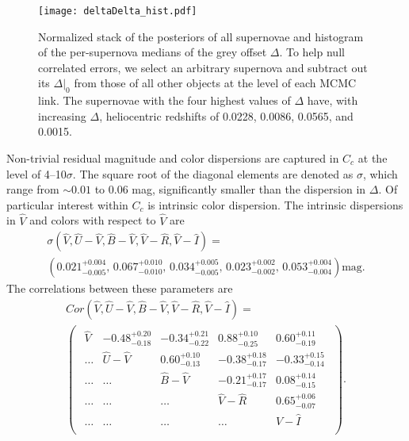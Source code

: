\documentclass{aastex61}   	%
\begin{document}
\begin{figure}[htbp] %
   \centering
   \texttt{[image: deltaDelta\_hist.pdf]} 
   \caption{
   Normalized \color{red} stack of the posteriors of all supernovae \color{black} and histogram of the \color{red} per-supernova \color{black} medians of the grey offset $\Delta$. 
   \color{red}  To help null correlated errors, we select
    an arbitrary supernova and subtract out its $\Delta|_0$ from those of all other objects at the level of each MCMC link.
   \color{black}
   The supernovae with the four highest values of $\Delta$ have, with increasing $\Delta$, heliocentric
   redshifts of 0.0228, 0.0086, 0.0565, and 0.0015.
   \label{hist:fig}}
\end{figure}

Non-trivial residual magnitude
and color dispersions are captured in $C_c$
at the level of 4--10$\sigma$.
The square
root of the diagonal elements are denoted as $\sigma$, which
range from
$\sim 0.01$ to 0.06 mag, significantly smaller
than the dispersion in $\Delta$.
Of particular interest within $C_c$ is intrinsic color dispersion.  The intrinsic dispersions in ${\hat{V}}$ and colors with respect to ${\hat{V}}$ are
\begin{multline}
\sigma({\hat{V}},{\hat{U}}-{\hat{V}},{\hat{B}}-{\hat{V}},{\hat{V}}-{\hat{R}},{\hat{V}}-{\hat{I}})=\\
\left(
0.021^{+0.004}_{-0.005} ,\, 
0.067^{+0.010}_{-0.010},\, 
0.034^{+0.005}_{-0.005},\, 
0.023^{+0.002}_{-0.002},\, 
0.053^{+0.004}_{-0.004}
\right)
 \text{mag}.
 \label{sig_intrinsic:eqn}
 \end{multline}
The correlations between these parameters are
\begin{multline}
Cor({\hat{V}},{\hat{U}}-{\hat{V}},{\hat{B}}-{\hat{V}},{\hat{V}}-{\hat{R}},{\hat{V}}-{\hat{I}})=\\
\begin{pmatrix}
\begin{array}{rrrrr}
\hat{V} & -0.48^{+0.20}_{-0.18} & -0.34^{+0.21}_{-0.22} & 0.88^{+0.10}_{-0.25} & 0.60^{+0.11}_{-0.19} \\
\ldots & {\hat{U}}-{\hat{V}} & 0.60^{+0.10}_{-0.13} & -0.38^{+0.18}_{-0.17} & -0.33^{+0.15}_{-0.14} \\
\ldots  & \ldots & {\hat{B}}-{\hat{V}} & -0.21^{+0.17}_{-0.17} & 0.08^{+0.14}_{-0.15} \\
\ldots  & \ldots  &\ldots  & {\hat{V}}-{\hat{R}} & 0.65^{+0.06}_{-0.07} \\
\ldots  & \ldots  &\ldots  &\ldots & {\hat{V}}-{\hat{I}} \\
\end{array}
 \end{pmatrix}.
 \label{cor_intrinsic:eqn}
 \end{multline}
\end{document}
